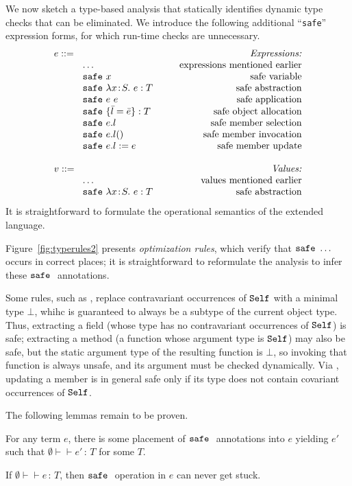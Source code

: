 \documentclass{article}
\newcommand{\lam}[4]{\lambda#1\!:\!#2.\,\,#4:#3}
\newcommand{\app}[2]{#1~#2}
\renewcommand{\t}[1]{{\tt #1}}
\newcommand{\judges}[3]{#1\vdash\!\!\!\vdash #2\,:\,#3}
\newcommand{\obje}[2]{\{#1\}:{#2}}
\newcommand{\objget}[2]{#1.#2}
\newcommand{\objcall}[2]{#1.#2()}
\newcommand{\objset}[3]{#1.#2:=#3}
\newcommand{\safe}[1]{\t{safe}~#1}
\newcommand{\self}{\t{Self}}
\begin{document}
We now sketch a 
type-based analysis that statically identifies dynamic type checks that can be eliminated.
We introduce the following additional ``\t{safe}'' expression forms, for which run-time checks are unnecessary.
\[
\begin{array}{llr}
	\mydefhead{e ::=\qquad\qquad\qquad\qquad\qquad}{Expressions:} 
	\mydefcase{\dots								}{expressions mentioned earlier} 
	\mydefcase{\safe x								}{safe variable} 
	\mydefcase{\safe{\lam{x}{S}{T}{e}} 				}{safe abstraction} 
	\mydefcase{\safe{\app{e}{e}} 					}{safe application} 
	\mydefcase{\safe{} \obje{\bar{l}=\bar{e}}{T}		}{safe object allocation}
	\mydefcase{\safe{}\objget{e}{l}					}{safe member selection}
	\mydefcase{\safe{}\objcall{e}{l}					}{safe member invocation}
	\mydefcase{\safe{}\objset{e}{l}{e}				}{safe member update}
	\\
	\mydefhead{v ::=\qquad\qquad\qquad\qquad\qquad}{Values:} 
	\mydefcase{\dots								}{values mentioned earlier} 
	\mydefcase{\safe{\lam{x}{S}{T}{e}} 				}{safe abstraction} 
\end{array}
\]
It is straightforward to formulate the operational semantics of the extended language.

Figure~\ref{fig:typerules2} presents \emph{optimization rules}, which verify that $\safe \dots$ occurs in correct places;
it is straightforward to reformulate the analysis to infer these $\safe{}$ annotations.

Some rules, such as , replace contravariant occurrences of $\self$ with a minimal type $\bot$,
whihc is guaranteed to always be a subtype of the current object type.
Thus, extracting a field (whose type has no contravariant occurrences of $\self$) is safe;
extracting a method (a function whose argument type is $\self$) may also be safe, 
but the static argument type of the resulting function is $\bot$, 
so invoking that function is always unsafe,
and its argument must be checked dynamically.
Via , updating a member is in general safe only if its type does not contain covariant occurrences of $\self$.

The following lemmas remain to be proven.

\begin{lemma}[No Failure]
For any term $e$, there is some placement of $\safe{}$ annotations into $e$ yielding $e'$ such that
$\judges{\emptyset}{e'}{T}$ for some $T$.
\end{lemma}

\begin{lemma}[Soundness]
If $\judges{\emptyset}{e}{T}$, then $\safe{}$ operation in $e$ can never get stuck.
\end{lemma}
\end{document}
